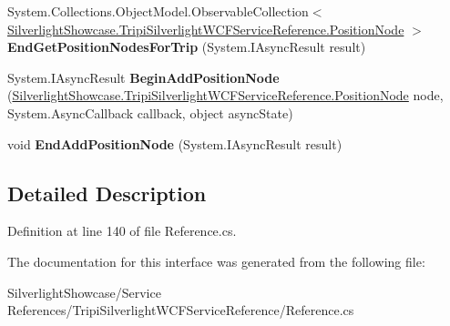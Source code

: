 \begin{DoxyCompactItemize}
\item 
\hypertarget{interface_silverlight_showcase_1_1_tripi_silverlight_w_c_f_service_reference_1_1_tripi_silverlight_w_c_f_service_a214818e2b8ceeeb53ae04408750e8f33}{
System.Collections.ObjectModel.ObservableCollection$<$ \hyperlink{class_silverlight_showcase_1_1_tripi_silverlight_w_c_f_service_reference_1_1_position_node}{SilverlightShowcase.TripiSilverlightWCFServiceReference.PositionNode} $>$ {\bfseries EndGetPositionNodesForTrip} (System.IAsyncResult result)}
\label{interface_silverlight_showcase_1_1_tripi_silverlight_w_c_f_service_reference_1_1_tripi_silverlight_w_c_f_service_a214818e2b8ceeeb53ae04408750e8f33}

\item 
\hypertarget{interface_silverlight_showcase_1_1_tripi_silverlight_w_c_f_service_reference_1_1_tripi_silverlight_w_c_f_service_a8ad21f6a496f08ddb68be3243d2150dd}{
System.IAsyncResult {\bfseries BeginAddPositionNode} (\hyperlink{class_silverlight_showcase_1_1_tripi_silverlight_w_c_f_service_reference_1_1_position_node}{SilverlightShowcase.TripiSilverlightWCFServiceReference.PositionNode} node, System.AsyncCallback callback, object asyncState)}
\label{interface_silverlight_showcase_1_1_tripi_silverlight_w_c_f_service_reference_1_1_tripi_silverlight_w_c_f_service_a8ad21f6a496f08ddb68be3243d2150dd}

\item 
\hypertarget{interface_silverlight_showcase_1_1_tripi_silverlight_w_c_f_service_reference_1_1_tripi_silverlight_w_c_f_service_ad2b799ef4022e5644549716c3f6e137f}{
void {\bfseries EndAddPositionNode} (System.IAsyncResult result)}
\label{interface_silverlight_showcase_1_1_tripi_silverlight_w_c_f_service_reference_1_1_tripi_silverlight_w_c_f_service_ad2b799ef4022e5644549716c3f6e137f}

\end{DoxyCompactItemize}


\subsection{Detailed Description}


Definition at line 140 of file Reference.cs.

The documentation for this interface was generated from the following file:\begin{DoxyCompactItemize}
\item 
SilverlightShowcase/Service References/TripiSilverlightWCFServiceReference/Reference.cs\end{DoxyCompactItemize}
